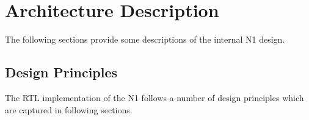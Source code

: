 
\section{Architecture Description}
\label{architecture}

The following sections provide some descriptions of the internal N1 design.


\subsection{Design Principles}
\label{architecture:principles}

The RTL implementation of the N1 follows a number of design principles which are captured in following sections. 

